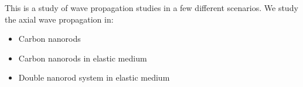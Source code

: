 This is a study of wave propagation studies in a few different scenarios. We study the axial wave propagation in:\\
\begin{itemize}
\item Carbon nanorods
\item Carbon nanorods in elastic medium
\item Double nanorod system in elastic medium
\end {itemize}

